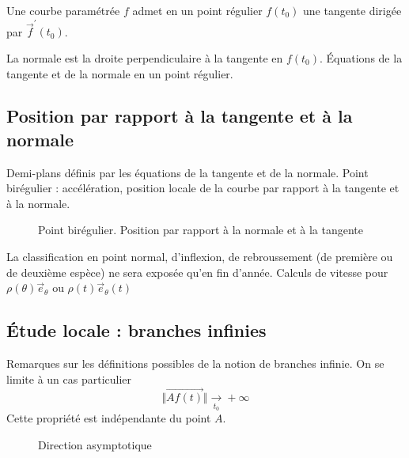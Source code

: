 \begin{prop}
 Une courbe paramétrée $f$ admet en un point régulier $f(t_0)$ une tangente dirigée par $\overrightarrow{f}^\prime(t_0)$.
\end{prop}

La normale est la droite perpendiculaire à la tangente en $f(t_0)$.
\'Equations de la tangente et de la normale en un point régulier.

\subsection{Position par rapport à la tangente et à la normale}
Demi-plans définis par les équations de la tangente et de la normale.
Point birégulier : accélération, position locale de la courbe par rapport à la tangente et à la normale.
\begin{figure}[!ht]
 \centering
 
 \caption{Point birégulier. Position par rapport à la normale et à la tangente}
\end{figure}


La classification en  point normal, d'inflexion, de rebroussement (de première ou de deuxième espèce) ne sera exposée qu'en fin d'année.
Calculs de vitesse pour $\rho(\theta)\overrightarrow{e}_\theta$ ou  $\rho(t)\overrightarrow{e}_\theta(t)$

\subsection{\'Etude locale : branches infinies}
Remarques sur les définitions possibles de la notion de branches infinie. On se limite à un cas particulier
\begin{displaymath}
 \Vert \overrightarrow{Af(t)}\Vert \xrightarrow[t_0]{} +\infty
\end{displaymath}
Cette propriété est indépendante du point $A$.
\begin{figure}[!ht]
 \centering
 
 \caption{Direction asymptotique}
\end{figure}

